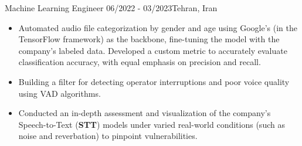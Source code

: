 \resumeSubheadingReza
{Machine Learning Engineer}{}
{06/2022 - 03/2023}{Tehran, Iran}
{
  \vspace{-12pt}
  \begin{itemize}
    \item {Automated audio file categorization by gender and age using Google's  (in the TensorFlow framework) as the backbone, fine-tuning the model with the company's labeled data. Developed a custom metric to accurately evaluate classification accuracy, with equal emphasis on precision and recall.}
    \item {Building a filter for detecting operator interruptions and poor voice quality using VAD algorithms.}
    \item {Conducted an in-depth assessment and visualization of the company's Speech-to-Text (\textbf{STT}) models under varied real-world conditions (such as noise and reverbation) to pinpoint vulnerabilities.}
  \end{itemize}
}
